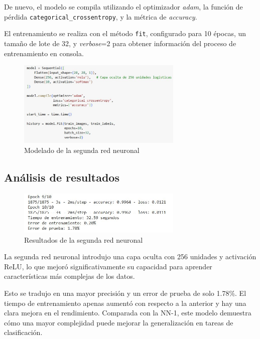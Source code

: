De nuevo, el modelo se compila utilizando el optimizador \textit{adam}, la función de pérdida \texttt{categorical\_crossentropy}, y la métrica de \textit{accuracy}.

El entrenamiento se realiza con el método \texttt{fit}, configurado para 10 épocas, un tamaño de lote de 32, y \textit{verbose}=2 para obtener información del proceso de entrenamiento en consola.

\begin{figure}[H]
	\centering
	\includegraphics[width=0.7\textwidth]{imgs/model-red2.JPG}
	\caption{Modelado de la segunda red neuronal}
	\label{fig:model-red2}
\end{figure}

\subsection{Análisis de resultados}

\begin{figure}[H]
	\centering
	\includegraphics[width=0.7\textwidth]{imgs/results-red2.JPG}
	\caption{Resultados de la segunda red neuronal}
	\label{fig:results-red2}
\end{figure}

La segunda red neuronal introdujo una capa oculta con 256 unidades y activación ReLU, lo que mejoró significativamente su capacidad para aprender características más complejas de los datos.

Esto se tradujo en una mayor precisión y un error de prueba de solo 1.78\%. El tiempo de entrenamiento apenas aumentó con respecto a la anterior y hay una clara mejora en el rendimiento. Comparada con la NN-1, este modelo demuestra cómo una mayor complejidad puede mejorar la generalización en tareas de clasificación.

